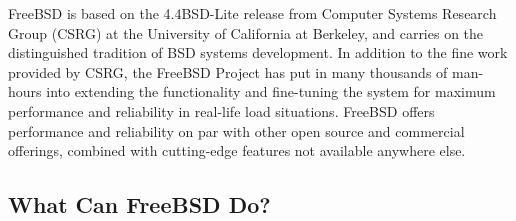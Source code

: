 FreeBSD is based on the 4.4BSD-Lite release from Computer Systems Research Group
(CSRG) at the University of California at Berkeley, and carries on the
distinguished tradition of BSD systems development.
In addition to the fine work provided by CSRG, the FreeBSD Project has put in
many thousands of man-hours into extending the functionality and fine-tuning the
system for maximum performance and reliability in real-life load situations.
FreeBSD offers performance and reliability on par with other open source and
commercial offerings, combined with cutting-edge features not available anywhere
else.

\subsection{What Can FreeBSD Do?}